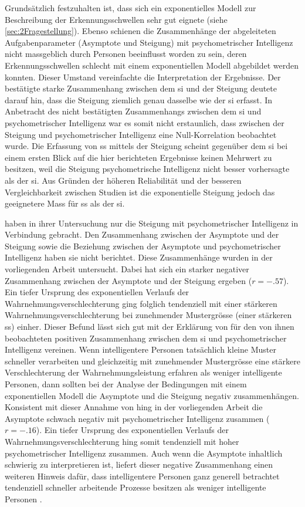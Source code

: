 \documentclass[11pt, twoside, a4paper]{book}		%
\begin{document}
Grundsätzlich festzuhalten ist, dass sich ein exponentielles Modell zur Beschreibung der Erkennungsschwellen sehr gut eignete (siehe \autoref{sec:2Fragestellung}). Ebenso schienen die Zusammenhänge der abgeleiteten Aufgabenparameter (Asymptote und Steigung) mit psychometrischer Intelligenz nicht massgeblich durch Personen beeinflusst worden zu sein, deren Erkennungsschwellen schlecht mit einem exponentiellen Modell abgebildet werden konnten. Dieser Umstand vereinfachte die Interpretation der Ergebnisse. Der bestätigte starke Zusammenhang zwischen dem \gls{si} und der Steigung deutete darauf hin, dass die Steigung ziemlich genau dasselbe wie der \gls{si} erfasst. In Anbetracht des nicht bestätigten Zusammenhangs zwischen dem \gls{si} und psychometrischer Intelligenz war es somit nicht erstaunlich, dass zwischen der Steigung und psychometrischer Intelligenz eine Null-Korrelation beobachtet wurde. Die Erfassung von \gls{ss} mittels der Steigung scheint gegenüber dem \gls{si} bei einem ersten Blick auf die hier berichteten Ergebnisse keinen Mehrwert zu besitzen, weil die Steigung psychometrische Intelligenz nicht besser vorhersagte als der \gls{si}. Aus Gründen der höheren Reliabilität und der besseren Vergleichbarkeit zwischen Studien ist die exponentielle Steigung jedoch das geeignetere Mass für \gls{ss} als der \gls{si}.

\citet{Melnick2013} haben in ihrer Untersuchung nur die Steigung mit psychometrischer Intelligenz in Verbindung gebracht. Den Zusammenhang zwischen der Asymptote und der Steigung sowie die Beziehung zwischen der Asymptote und psychometrischer Intelligenz haben sie nicht berichtet. Diese Zusammenhänge wurden in der vorliegenden Arbeit untersucht. Dabei hat sich ein starker negativer Zusammenhang zwischen der Asymptote und der Steigung ergeben ($r=-.57$). Ein tiefer Ursprung des exponentiellen Verlaufs der Wahrnehmungsverschlechterung ging folglich tendenziell  mit einer stärkeren Wahrnehmungsverschlechterung bei zunehmender Mustergrösse (einer stärkeren \gls{ss}) einher.
Dieser Befund lässt sich gut mit der Erklärung von \citeauthor{Melnick2013} für den von ihnen beobachteten positiven Zusammenhang zwischen dem \gls{si} und psychometrischer Intelligenz vereinen. Wenn intelligentere Personen tatsächlich kleine Muster schneller verarbeiten und gleichzeitig mit zunehmender Mustergrösse eine stärkere Verschlechterung der Wahrnehmungsleistung erfahren als weniger intelligente Personen, dann sollten bei der Analyse der Bedingungen mit einem exponentiellen Modell die Asymptote und die Steigung negativ zusammenhängen. 
Konsistent mit dieser Annahme von \citeauthor{Melnick2013} hing in der vorliegenden Arbeit die Asymptote schwach negativ mit psychometrischer Intelligenz zusammen ($r=-.16$). Ein tiefer Ursprung des exponentiellen Verlaufs der Wahrnehmungsverschlechterung hing somit tendenziell mit hoher psychometrischer Intelligenz zusammen. Auch wenn die Asymptote inhaltlich schwierig zu interpretieren ist, liefert dieser negative Zusammenhang einen weiteren Hinweis dafür, dass intelligentere Personen ganz generell betrachtet tendenziell schneller arbeitende Prozesse besitzen als weniger intelligente Personen \citep{Jensen1987a, Jensen1998b, Neubauer1997a, Neubauer1997b}.
\end{document}
